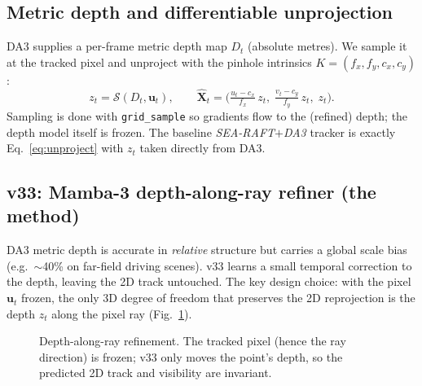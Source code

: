 \documentclass[11pt,a4paper]{article}
\begin{document}
\subsection{Metric depth and differentiable unprojection}
DA3 supplies a per-frame metric depth map $D_t$ (absolute metres). We sample it at the tracked
pixel and unproject with the pinhole intrinsics $K=(f_x,f_y,c_x,c_y)$:
\begin{equation}
z_t = \mathcal{S}(D_t,\mathbf{u}_t),\qquad
\hat{\mathbf X}_t = \Big(\tfrac{u_t-c_x}{f_x}\,z_t,\;\tfrac{v_t-c_y}{f_y}\,z_t,\;z_t\Big).
\label{eq:unproject}
\end{equation}
Sampling is done with \texttt{grid\_sample} so gradients flow to the (refined) depth; the depth
model itself is frozen. The baseline \emph{SEA-RAFT$+$DA3} tracker is exactly
Eq.~\eqref{eq:unproject} with $z_t$ taken directly from DA3.

\subsection{v33: Mamba-3 depth-along-ray refiner (the method)}
DA3 metric depth is accurate in \emph{relative} structure but carries a global scale bias
(e.g.\ $\sim$40\% on far-field driving scenes). v33 learns a small temporal correction to the
depth, leaving the 2D track untouched. The key design choice: with the pixel $\mathbf{u}_t$ frozen,
the only 3D degree of freedom that preserves the 2D reprojection is the depth $z_t$ along the pixel
ray (Fig.~\ref{fig:ray}).

\begin{figure}[h]
\centering
{}
\caption{Depth-along-ray refinement. The tracked pixel (hence the ray direction) is frozen;
v33 only moves the point's depth, so the predicted 2D track and visibility are invariant.}
\label{fig:ray}
\end{figure}
\end{document}
